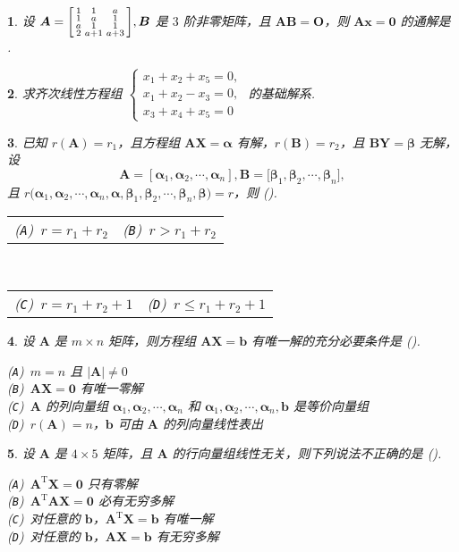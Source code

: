 \documentclass[openany,twocolumn]{ctexbook}
\makeatletter
\numberwithin{figure}{section}
\theoremstyle{change}
\theoremstyle{change}
\newtheorem{titwo}{}
\def\htwo{ \uline{\hspace{\fill}}}
\def\kuo{ \mbox{(\hspace{1pc})}}
\newcommand{\twoch}[4]{\noindent\begin{tabular}{*{2}{@{}p{3.94cm}}}(\texttt{A})~#1 & (\texttt{B})~#2\end{tabular}\\\begin{tabular}{*{2}{@{}p{3.94cm}}}(\texttt{C})~#3 & (\texttt{D})~#4\end{tabular}}  %
\newcommand{\onech}[4]{\noindent(\texttt{A})~#1 \\ (\texttt{B})~#2 \\ (\texttt{C})~#3 \\ (\texttt{D})~#4}  %
\def\leq{\leqslant}
\def\TT{\mathrm{T}}
\makeatother
\begin{document}
	\begin{titwo}
		设 $\bm A = \begin{bsmallmatrix}
			1 & 1 & a \\
			1 & a & 1 \\
			a & 1 & 1 \\
			2 & a + 1 & a + 3
		\end{bsmallmatrix},\bm B$ 是 $3$ 阶非零矩阵，且 $\bm A \bm B = \bm O$，则 $\bm A \bm x = \bm 0$ 的通解是\htwo.
	\end{titwo}

	\begin{titwo}
		求齐次线性方程组 $\begin{cases}
			x_{1} + x_{2} + x_{5} = 0,\\
			x_{1} + x_{2} - x_{3} = 0,\\
			x_{3} + x_{4} + x_{5} = 0
		\end{cases}$ 的基础解系.
	\end{titwo}

	\begin{titwo}
		已知 $r(\bm A) = r_{1}$，且方程组 $\bm A \bm X = \bm \alpha$ 有解，$r(\bm B) = r_{2}$，且 $\bm B \bm Y = \bm \beta$ 无解，设
		\[
			\bm A = [\bm \alpha_{1},\bm \alpha_{2},\cdots,\bm \alpha_{n}], \bm B = \bigl[\bm \beta_{1},\bm \beta_{2},\cdots,\bm \beta_{n}\bigr],
		\]
		且 $r\bigl(\bm \alpha_{1},\bm \alpha_{2},\cdots,\bm \alpha_{n},\bm \alpha,\bm \beta_{1},\bm \beta_{2},\cdots,\bm \beta_{n},\bm \beta\bigr) = r$，则\kuo.

		\twoch{$r = r_{1} + r_{2}$}{$r > r_{1} + r_{2}$}{$r = r_{1} + r_{2} + 1$}{$r \leq r_{1} + r_{2} + 1$}
	\end{titwo}

	\begin{titwo}
		设 $\bm A$ 是 $m \times n$ 矩阵，则方程组 $\bm A \bm X = \bm b$ 有唯一解的充分必要条件是\kuo.

		\onech{$m = n$ 且 $|\bm A| \ne 0$}{$\bm A \bm X = \bm 0$ 有唯一零解}{$\bm A$ 的列向量组 $\bm \alpha_{1},\bm \alpha_{2},\cdots,\bm \alpha_{n}$ 和 $\bm \alpha_{1},\bm \alpha_{2},\cdots,\bm \alpha_{n},\bm b$ 是等价向量组}{$r(\bm A) = n$，$\bm b$ 可由 $\bm A$ 的列向量线性表出}
	\end{titwo}

	\begin{titwo}
		设 $\bm A$ 是 $4 \times 5$ 矩阵，且 $\bm A$ 的行向量组线性无关，则下列说法不正确的是\kuo.
		
		\onech{$\bm A^{\TT} \bm X = \bm 0$ 只有零解}{$\bm A^{\TT} \bm A \bm X = \bm 0$ 必有无穷多解}{对任意的 $\bm b$，$\bm A^{\TT} \bm X = \bm b$ 有唯一解}{对任意的 $\bm b$，$\bm A \bm X = \bm b$ 有无穷多解}
	\end{titwo}
\end{document}
